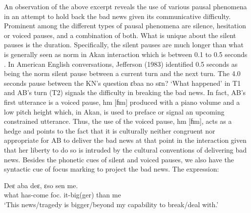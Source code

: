 \documentclass[output=paper,colorlinks,citecolor=brown]{langscibook}
\begin{document}
An observation of the above excerpt reveals the use of various pausal phenomena in an attempt to hold back the bad news given its communicative difficulty. Prominent among the different types of pausal phenomena are silence, hesitation or voiced pauses, and a combination of both. What is unique about the silent pauses is the duration. Specifically, the silent pauses are much longer than what is generally seen as norm in Akan interaction which is between 0.1 to 0.5 seconds \citep{Obeng1987, Obeng1989, Obeng1999} . In American English conversations, Jefferson (1983) identified 0.5 seconds as being the norm silent pause between a current turn and the next turn. The 4.0 seconds pause between the KN’s question ɛbaa no sɛn? ‘What happened’ in T1 and AB’s turn (T2) signals the difficulty in breaking the bad news. In fact, AB’s first utterance is a voiced pause, hm [ɦm] produced with a piano volume and a low pitch height which, in Akan, is used to preface or signal an upcoming constrained utterance. Thus, the use of the voiced pause, hm [ɦm], acts as a hedge and points to the fact that it is culturally neither congruent nor appropriate for AB to deliver the bad news at that point in the interaction given that her liberty to do so is intruded by the cultural conventions of delivering bad news. Besides the phonetic cues of silent and voiced pauses, we also have the syntactic cue of focus marking to project the bad news. The expression:

\ea
    \gll    Deɛ aba deɛ, ɛso sen me.\\
            what has-come foc. it-big(ger) than me\\
    \glt    `This news/tragedy is bigger/beyond my capability to break/deal with.'
\z
\end{document}
